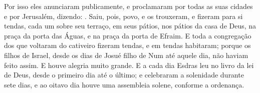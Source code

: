 {  Por isso eles anunciaram publicamente, e proclamaram por todas as suas cidades e por Jerusalém, dizendo: .
  Saiu, pois, povo, e os trouxeram, e fizeram para si tendas, cada um sobre seu terraço, em seus pátios, nos pátios da casa de Deus, na praça da porta das Águas, e na praça da porta de Efraim.
  E toda a congregação dos que voltaram do cativeiro fizeram tendas, e em tendas habitaram; porque os filhos de Israel, desde os dias de Josué filho de Num até aquele dia, não haviam feito assim. E houve alegria muito grande.
  E a cada dia Esdras leu no livro da lei de Deus, desde o primeiro dia até o último; e celebraram a solenidade durante sete dias, e ao oitavo dia houve uma assembleia solene, conforme a ordenança.
\par }

